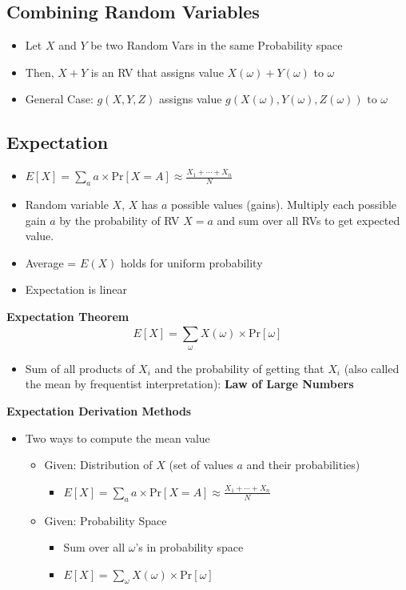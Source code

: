 \documentclass{article}\usepackage{amsmath,amssymb,amsthm,tikz,tkz-graph,color,chngpage,soul,hyperref,csquotes,graphicx,floatrow, listings}\newcommand*{\QEDB}{\hfill\ensuremath{\square}}\newtheorem*{prop}{Proposition}\renewcommand{\theenumi}{\alph{enumi}}\usepackage[shortlabels]{enumitem}\usepackage[nobreak=true]{mdframed}\usetikzlibrary{matrix,calc}\MakeOuterQuote{"}\usepackage[margin=0.75in]{geometry} \newtheorem{theorem}{Theorem}\newcommand{\Z}{\mathbb Z}\newcommand{\R}{\mathbb R}\newcommand{\Q}{\mathbb Q}\newcommand{\N}{\mathbb N}\newcommand{\x}[1]{\textrm{ #1 }}\newcommand{\pr}{\textrm{Pr}}
\newcommand{\sumlim}[3]{\sum\limits_{#1}^{#2}#3}
\newcommand{\eq}[1]{\begin{equation}#1\end{equation}}
\begin{document}
\subsection*{Combining Random Variables}
\begin{itemize}
    \item Let $X$ and $Y$ be two Random Vars in the same Probability space
    \item Then, $X+Y$ is an RV that assigns value $X(\omega)+Y(\omega)$ to $\omega$
    \item General Case: $g(X,Y,Z)$ assigns value $g(X(\omega), Y(\omega), Z(\omega)) \x{to} \omega$
\end{itemize}
\subsection*{Expectation}
\begin{itemize}
    \item $E[X]=\sumlim{a}{}{a\times \pr[X=A]}\approx \frac{X_1+\cdots+X_n}{N}$
    \item Random variable $X$, $X$ has $a$ possible values (gains). Multiply each possible gain $a$ by the probability of RV $X=a$ and sum over all RVs to get expected value.
    \item Average = $E(X)$ holds for uniform probability
    \item Expectation is linear
\end{itemize}
\begin{mdframed}
\textbf{Expectation Theorem}
\eq{E[X]=\sumlim{\omega}{}{X(\omega)\times \pr[\omega]}}
\begin{itemize}
    \item Sum of all products of $X_i$ and the probability of getting that $X_i$ (also called the mean by frequentist interpretation): \textbf{Law of Large Numbers}
\end{itemize}
\end{mdframed}
\begin{mdframed}
\textbf{Expectation Derivation Methods}
\begin{itemize}
    \item Two ways to compute the mean value
    \begin{itemize}
        \item Given: Distribution of $X$ (set of values $a$ and their probabilities)
        \begin{itemize}
            \item $E[X]=\sumlim{a}{}{a\times \pr[X=A]}\approx \frac{X_1+\cdots+X_n}{N}$
        \end{itemize}
        \item Given: Probability Space
        \begin{itemize}
            \item Sum over all $\omega$'s in probability space
            \item $E[X]=\sumlim{\omega}{}{X(\omega)\times \pr[\omega]}$
        \end{itemize}
    \end{itemize}
\end{itemize}
\end{mdframed}
\end{document}
